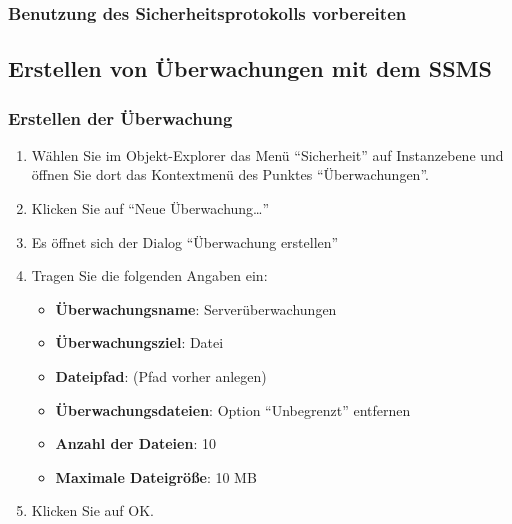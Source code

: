         \subsubsection{Benutzung des Sicherheitsprotokolls vorbereiten}
      \subsection{Erstellen von Überwachungen mit dem SSMS}
        \subsubsection{Erstellen der Überwachung}
          \begin{enumerate}
            \item Wählen Sie im Objekt-Explorer das Menü \enquote{Sicherheit} auf
            Instanzebene und öffnen Sie dort das Kontextmenü des Punktes
            \enquote{Überwachungen}.
            \item Klicken Sie auf \enquote{Neue Überwachung\ldots}
            \item Es öffnet sich der Dialog \enquote{Überwachung erstellen}
            \item Tragen Sie die folgenden Angaben ein:
            \begin{itemize}
              \item \textbf{Überwachungsname}: Serverüberwachungen
              \item \textbf{Überwachungsziel}: Datei
              \item \textbf{Dateipfad}:  (Pfad vorher anlegen)
              \item \textbf{Überwachungsdateien}: Option \enquote{Unbegrenzt}
              entfernen
              \item \textbf{Anzahl der Dateien}: 10
              \item \textbf{Maximale Dateigröße}: 10 MB
            \end{itemize}
            \item Klicken Sie auf OK.
          \end{enumerate}
